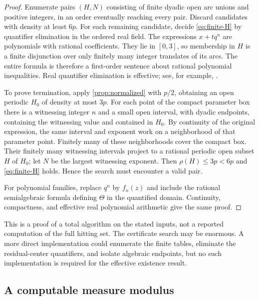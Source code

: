 \begin{proof}
Enumerate pairs $(H,N)$ consisting of finite dyadic open arc unions
and positive integers, in an order eventually reaching every pair.
Discard candidates with density at least $6p$. For each remaining
candidate, decide \eqref{eq:finite-H} by quantifier elimination in
the ordered real field. The expressions $x+tq^n$ are polynomials with
rational coefficients. They lie in $[0,3]$, so membership in $H$
is a finite disjunction over only finitely many integer translates
of its arcs. The entire formula is therefore a first-order sentence
about rational polynomial inequalities. Real quantifier elimination
is effective; see, for example, \cite{PerrucciRoy}.

To prove termination, apply \cref{prop:normalized} with $p/2$,
obtaining an open periodic $H_0$ of density at most $3p$.
For each point of the compact parameter box there is a witnessing
integer $n$ and a small open interval, with dyadic endpoints, containing
the witnessing value and contained in $H_0$. By continuity of the
original expression, the same interval and exponent work on a
neighborhood of that parameter point. Finitely many of these
neighborhoods cover the compact box. Their finitely many witnessing
intervals project to a rational periodic open subset $H$ of $H_0$;
let $N$ be the largest witnessing exponent. Then
$\rho(H)\le3p<6p$ and \eqref{eq:finite-H} holds. Hence the search
must encounter a valid pair.

For polynomial families, replace $q^n$ by $f_n(z)$ and include the
rational semialgebraic formula defining $\Theta$ in the quantified
domain. Continuity, compactness, and effective real polynomial
arithmetic give the same proof.
\end{proof}

This is a proof of a total algorithm on the stated inputs, not a
reported computation of the full hitting set. The certificate search
may be enormous. A more direct implementation could enumerate the
finite tables, eliminate the residual-center quantifiers, and isolate
algebraic endpoints, but no such implementation is required for the
effective existence result.

\subsection{A computable measure modulus}

